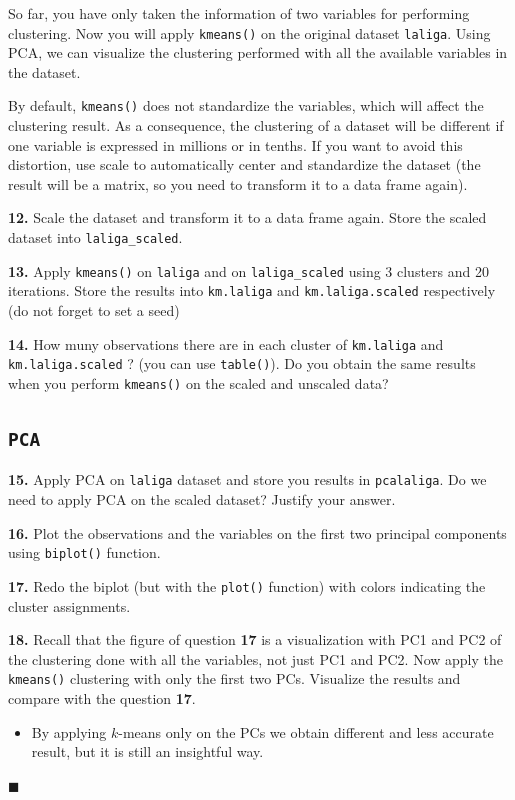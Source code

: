 \documentclass[]{book}
\newenvironment{rmdblock}[1]
  {\begin{shaded*}
  \begin{itemize}
  \renewcommand{\labelitemi}{
    \raisebox{-.7\height}[0pt][0pt]{
      {\setkeys{Gin}{width=2em,keepaspectratio}\texttt{[image: img/icons/\#1]}}
    }
  }
  \item
  }
  {
  \end{itemize}
  \end{shaded*}
  }
\newenvironment{rmdinsight}
  {\begin{rmdblock}{insight}}
  {\end{rmdblock}}
\begin{document}
So far, you have only taken the information of two variables for
performing clustering. Now you will apply \texttt{kmeans()} on the
original dataset \texttt{laliga}. Using PCA, we can visualize the
clustering performed with all the available variables in the dataset.

By default, \texttt{kmeans()} does not standardize the variables, which
will affect the clustering result. As a consequence, the clustering of a
dataset will be different if one variable is expressed in millions or in
tenths. If you want to avoid this distortion, use scale to automatically
center and standardize the dataset (the result will be a matrix, so you
need to transform it to a data frame again).

\textbf{12.} Scale the dataset and transform it to a data frame again.
Store the scaled dataset into \texttt{laliga\_scaled}.

\textbf{13.} Apply \texttt{kmeans()} on \texttt{laliga} and on
\texttt{laliga\_scaled} using 3 clusters and 20 iterations. Store the
results into \texttt{km.laliga} and \texttt{km.laliga.scaled}
respectively (do not forget to set a seed)

\textbf{14.} How muny observations there are in each cluster of
\texttt{km.laliga} and \texttt{km.laliga.scaled} ? (you can use
\texttt{table()}). Do you obtain the same results when you perform
\texttt{kmeans()} on the scaled and unscaled data?

\subsection*{\texorpdfstring{\texttt{PCA}}{PCA}}\label{pca}

\textbf{15.} Apply PCA on \texttt{laliga} dataset and store you results
in \texttt{pcalaliga}. Do we need to apply PCA on the scaled dataset?
Justify your answer.

\textbf{16.} Plot the observations and the variables on the first two
principal components using \texttt{biplot()} function.

\textbf{17.} Redo the biplot (but with the \texttt{plot()} function)
with colors indicating the cluster assignments.

\textbf{18.} Recall that the figure of question \textbf{17} is a
visualization with PC1 and PC2 of the clustering done with all the
variables, not just PC1 and PC2. Now apply the \texttt{kmeans()}
clustering with only the first two PCs. Visualize the results and
compare with the question \textbf{17}.

\begin{rmdinsight}
By applying \(k\)-means only on the PCs we obtain different and less
accurate result, but it is still an insightful way.
\end{rmdinsight}

◼
\end{document}
